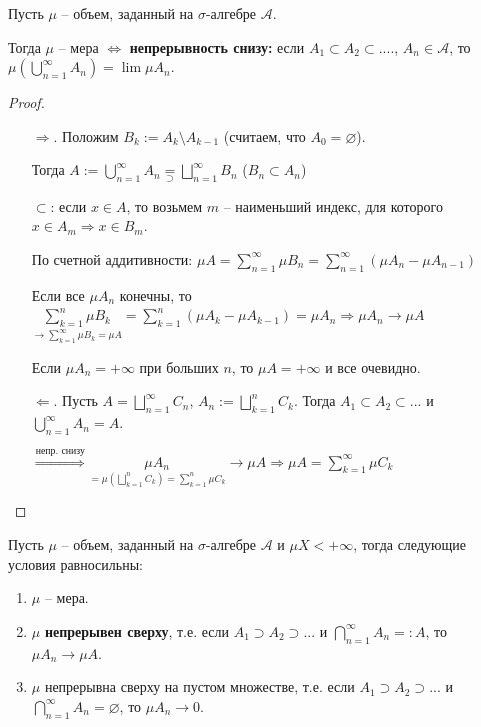 \begin{theorem}
    Пусть $\mu$ – объем, заданный на $\sigma$-алгебре $\mathcal{A}$. 
    
    Тогда $\mu$ – мера $\Leftrightarrow$ \textbf{непрерывность снизу:} если $A_1 \subset A_2 \subset ....$, $A_n\in \mathcal{A}$,
    то $\mu (\bigcup\limits_{n=1}^\infty A_n) =\lim \mu A_n$.
\end{theorem}

\begin{proof}~
    \begin{enumerate}
        \item[$\Rightarrow$.] Положим $B_k := A_k \setminus A_{k-1}$ (считаем, что $A_0=\varnothing$).
        
        Тогда $A:=\bigcup\limits_{n=1}^\infty A_n \underset{\supset}{=} \bigsqcup\limits_{n=1}^\infty B_n$ ($B_n \subset A_n$)

        $\subset$: если $x\in A$, то возьмем $m$ – наименьший индекс, для которого $x\in A_m\Rightarrow x\in B_m$.

        По счетной аддитивности: $\mu A= \sum \limits_{n=1}^\infty \mu B_n = \sum \limits_{n=1}^\infty(\mu A_n - \mu A_{n-1})$

        Если все $\mu A_n$ конечны, то $\underset{\rightarrow \sum \limits_{k=1}^\infty \mu B_k=\mu A}{\sum \limits_{k=1}^n \mu B_k} = \sum \limits_{k=1}^n (\mu A_k - \mu A_{k-1})=\mu A_n\Rightarrow \mu A_n\rightarrow \mu A$

        Если $\mu A_n=+\infty$ при больших $n$, то $\mu A=+\infty$ и все очевидно.

        \item[$\Leftarrow$.] Пусть $A=\bigsqcup \limits_{n=1}^\infty C_n$, $A_n:=\bigsqcup \limits_{k=1}^n C_k$. Тогда $A_1\subset A_2 \subset ...$ и $\bigcup\limits_{n=1}^\infty A_n = A$.
        
        $\overset{\text{непр. снизу}}{\Rightarrow}\underset{=\mu (\bigsqcup\limits_{k=1}^n C_k)=\sum\limits_{k=1}^n\mu C_k}{\mu A_n}\rightarrow \mu A
        \Rightarrow \mu A = \sum\limits_{k=1}^\infty \mu C_k$
    \end{enumerate}
\end{proof}

\begin{theorem}
    Пусть $\mu$ –  объем, заданный на $\sigma$-алгебре $\mathcal{A}$ и $\mu X< +\infty$, 
    тогда следующие условия равносильны:
    \begin{enumerate}
        \item $\mu$ – мера.
        \item $\mu$ \textbf{непрерывен сверху}, т.е. если $A_1 \supset A_2 \supset ...$ и $\bigcap\limits_{n=1}^\infty A_n = :A$, 
        то $\mu A_n \rightarrow \mu A$.
        \item $\mu$ непрерывна сверху на пустом множестве, т.е. если $A_1 \supset A_2 \supset ...$ и $\bigcap\limits_{n=1}^\infty A_n = \varnothing$, то $\mu A_n \rightarrow 0$.
    \end{enumerate}
\end{theorem}

